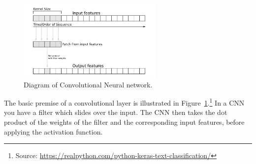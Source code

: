 \begin{figure}[h!]
  \centering
  \includegraphics[width = 200pt]{figs/cnn_diagram}
  \caption{Diagram of Convolutional Neural network.}
  \label{cnn}
\end{figure}

The basic premise of a convolutional layer is illustrated in Figure~\ref{cnn}.\footnote{Source: \url{https://realpython.com/python-keras-text-classification/}} In a CNN you have a filter which slides over the input. The CNN then takes the dot product of the weights of the filter and the corresponding input features, before applying the activation function.\\
